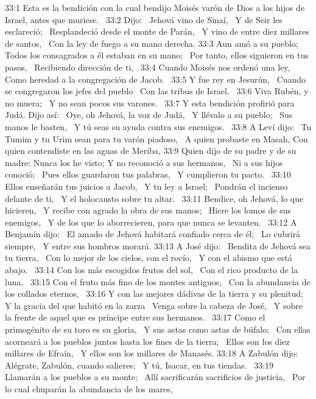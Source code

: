 33:1 Esta es la bendición con la cual bendijo Moisés varón de Dios a los hijos de Israel, antes que muriese.  
33:2 Dijo:  
Jehová vino de Sinaí,  
Y de Seir les esclareció;  
Resplandeció desde el monte de Parán,  
Y vino de entre diez millares de santos,  
Con la ley de fuego a su mano derecha. 
33:3 Aun amó a su pueblo;  
Todos los consagrados a él estaban en su mano;  
Por tanto, ellos siguieron en tus pasos,  
Recibiendo dirección de ti,  
33:4 Cuando Moisés nos ordenó una ley,  
Como heredad a la congregación de Jacob.  
33:5 Y fue rey en Jesurún,  
Cuando se congregaron los jefes del pueblo  
Con las tribus de Israel.  
33:6 Viva Rubén, y no muera;  
Y no sean pocos sus varones.  
33:7 Y esta bendición profirió para Judá. Dijo así:  
Oye, oh Jehová, la voz de Judá,  
Y llévalo a su pueblo;  
Sus manos le basten,  
Y tú seas su ayuda contra sus enemigos.  
33:8 A Leví dijo:  
Tu Tumim y tu Urim sean para tu varón piadoso,  
A quien probaste en Masah, 
Con quien contendiste en las aguas de Meriba, 
33:9 Quien dijo de su padre y de su madre: Nunca los he visto; 
Y no reconoció a sus hermanos,  
Ni a sus hijos conoció;  
Pues ellos guardaron tus palabras,  
Y cumplieron tu pacto.  
33:10 Ellos enseñarán tus juicios a Jacob,  
Y tu ley a Israel;  
Pondrán el incienso delante de ti,  
Y el holocausto sobre tu altar.  
33:11 Bendice, oh Jehová, lo que hicieren,  
Y recibe con agrado la obra de sus manos;  
Hiere los lomos de sus enemigos,  
Y de los que lo aborrecieren, para que nunca se levanten.  
33:12 A Benjamín dijo:  
El amado de Jehová habitará confiado cerca de él;  
Lo cubrirá siempre,  
Y entre sus hombros morará. 
33:13 A José dijo:  
Bendita de Jehová sea tu tierra,  
Con lo mejor de los cielos, con el rocío,  
Y con el abismo que está abajo.  
33:14 Con los más escogidos frutos del sol,  
Con el rico producto de la luna,  
33:15 Con el fruto más fino de los montes antiguos,  
Con la abundancia de los collados eternos,  
33:16 Y con las mejores dádivas de la tierra y su plenitud;  
Y la gracia del que habitó en la zarza  
Venga sobre la cabeza de José,  
Y sobre la frente de aquel que es príncipe entre sus hermanos.  
33:17 Como el primogénito de su toro es su gloria,  
Y sus astas como astas de búfalo;  
Con ellas acorneará a los pueblos juntos hasta los fines de la tierra;  
Ellos son los diez millares de Efraín,  
Y ellos son los millares de Manasés. 
33:18 A Zabulón dijo:  
Alégrate, Zabulón, cuando salieres;  
Y tú, Isacar, en tus tiendas.  
33:19 Llamarán a los pueblos a su monte;  
Allí sacrificarán sacrificios de justicia,  
Por lo cual chuparán la abundancia de los mares,  
